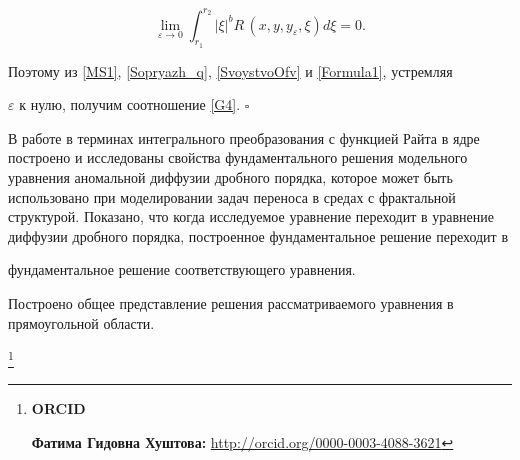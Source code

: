 $$

\lim\limits_{\varepsilon\to 0} 

\int _{r_1}^{r_2}|\xi|^{b}

R\,(x,y,y_{\varepsilon},\xi) d\xi=0.$$

Поэтому из \eqref{MS1}, \eqref{Sopryazh_q}, \eqref{SvoystvoOfv} и \eqref{Formula1}, устремляя  

$\varepsilon$ к нулю, получим соотношение \eqref{G4}. $\square$





\smallskip



 В работе в терминах интегрального преобразования с функцией Райта в ядре построено и исследованы свойства фундаментального решения модельного уравнения аномальной диффузии дробного порядка, которое может быть использовано при моделировании задач переноса в средах с фрактальной структурой. Показано, что когда исследуемое уравнение переходит в уравнение диффузии дробного порядка, построенное  фундаментальное решение переходит в 

фундаментальное решение  соответствующего уравнения. 

Построено общее представление решения рассматриваемого уравнения в прямоугольной области.



\thanks{{\bf ORCID}



{\bf Фатима Гидовна Хуштова:}    \url{http://orcid.org/0000-0003-4088-3621}



}





\RusRef





